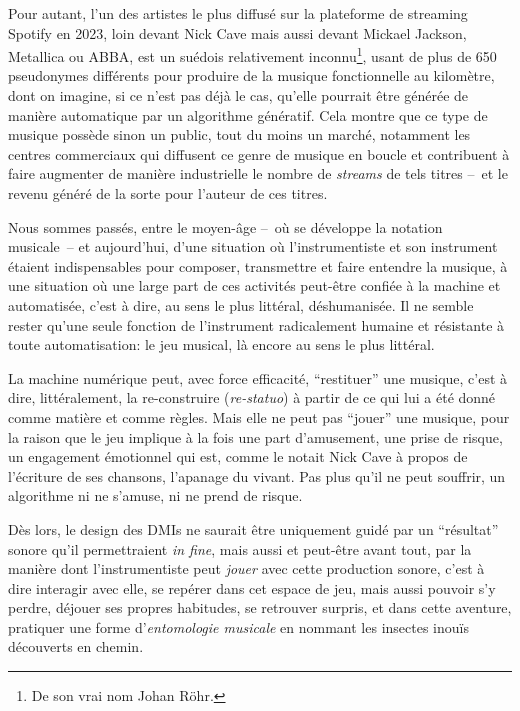 Pour autant, l'un des artistes le plus diffusé sur la plateforme de streaming Spotify en 2023, loin devant Nick Cave mais aussi devant Mickael Jackson, Metallica ou ABBA, est un suédois relativement inconnu\footnote{De son vrai nom Johan Röhr.}, usant de plus de 650 pseudonymes différents pour produire de la musique fonctionnelle au kilomètre, dont on imagine, si ce n'est pas déjà le cas, qu'elle pourrait être générée de manière automatique par un algorithme génératif. Cela montre que ce type de musique possède sinon un public, tout du moins un marché, notamment les centres commerciaux qui diffusent ce genre de musique en boucle et contribuent à faire augmenter de manière industrielle le nombre de \textit{streams} de tels titres --~et le revenu généré de la sorte pour l'auteur de ces titres.


Nous sommes passés, entre le moyen-âge --~où se développe la notation musicale~-- et aujourd'hui, d'une situation où l'instrumentiste et son instrument étaient indispensables pour composer, transmettre et faire entendre la musique, à une situation où une large part de ces activités peut-être confiée à la machine et automatisée, c'est à dire, au sens le plus littéral, déshumanisée.
Il ne semble rester qu'une seule fonction de l'instrument radicalement humaine et résistante à toute automatisation: le jeu musical, là encore au sens le plus littéral.


La machine numérique peut, avec force efficacité, ``restituer'' une musique, c'est à dire, littéralement, la re-construire (\textit{re-statuo}) à partir de ce qui lui a été donné comme matière et comme règles.
Mais elle ne peut pas ``jouer'' une musique, pour la raison que le jeu implique à la fois une part d'amusement, une prise de risque, un engagement émotionnel qui est, comme le notait Nick Cave à propos de l'écriture de ses chansons, l'apanage du vivant. Pas plus qu'il ne peut souffrir, un algorithme ni ne s'amuse, ni ne prend de risque.

Dès lors, le design des \glspl{DMI} ne saurait être uniquement guidé par un ``résultat'' sonore qu'il permettraient \textit{in fine}, mais aussi et peut-être avant tout, par la manière dont l'instrumentiste peut \textit{jouer} avec cette production sonore, c'est à dire interagir avec elle, se repérer dans cet espace de jeu, mais aussi pouvoir s'y perdre, déjouer ses propres habitudes, se retrouver surpris, et dans cette aventure, pratiquer une forme d'\textit{entomologie musicale} en nommant les insectes inouïs découverts en chemin.


